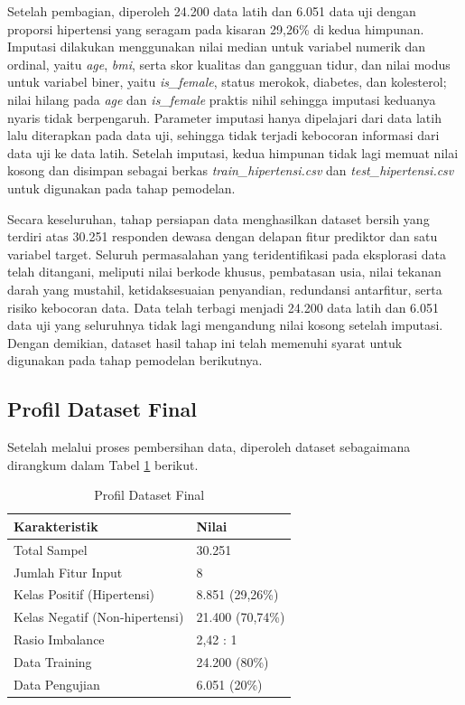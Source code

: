 Setelah pembagian, diperoleh 24.200 data latih dan 6.051 data uji dengan proporsi hipertensi yang seragam pada kisaran 29,26\% di kedua himpunan. Imputasi dilakukan menggunakan nilai median untuk variabel numerik dan ordinal, yaitu \textit{age}, \textit{bmi}, serta skor kualitas dan gangguan tidur, dan nilai modus untuk variabel biner, yaitu \textit{is\_female}, status merokok, diabetes, dan kolesterol; nilai hilang pada \textit{age} dan \textit{is\_female} praktis nihil sehingga imputasi keduanya nyaris tidak berpengaruh. Parameter imputasi hanya dipelajari dari data latih lalu diterapkan pada data uji, sehingga tidak terjadi kebocoran informasi dari data uji ke data latih. Setelah imputasi, kedua himpunan tidak lagi memuat nilai kosong dan disimpan sebagai berkas \textit{train\_hipertensi.csv} dan \textit{test\_hipertensi.csv} untuk digunakan pada tahap pemodelan.

Secara keseluruhan, tahap persiapan data menghasilkan dataset bersih yang terdiri atas 30.251 responden dewasa dengan delapan fitur prediktor dan satu variabel target. Seluruh permasalahan yang teridentifikasi pada eksplorasi data telah ditangani, meliputi nilai berkode khusus, pembatasan usia, nilai tekanan darah yang mustahil, ketidaksesuaian penyandian, redundansi antarfitur, serta risiko kebocoran data. Data telah terbagi menjadi 24.200 data latih dan 6.051 data uji yang seluruhnya tidak lagi mengandung nilai kosong setelah imputasi. Dengan demikian, dataset hasil tahap ini telah memenuhi syarat untuk digunakan pada tahap pemodelan berikutnya.









\subsection{Profil Dataset Final}
Setelah melalui proses pembersihan data, diperoleh dataset sebagaimana dirangkum dalam Tabel \ref{tab:profil-dataset-final} berikut.

\begin{table}[H]
    \centering
    \caption{Profil Dataset Final}
    \label{tab:profil-dataset-final}
    \begin{tabular}{|p{5.5cm}|p{5.5cm}|}
        \hline
        \textbf{Karakteristik} & \textbf{Nilai} \\
        \hline
        Total Sampel & 30.251 \\
        \hline
        Jumlah Fitur Input & 8 \\
        \hline
        Kelas Positif (Hipertensi) & 8.851 (29,26\%) \\
        \hline
        Kelas Negatif (Non-hipertensi) & 21.400 (70,74\%) \\
        \hline
        Rasio Imbalance & 2,42 : 1 \\
        \hline
        Data Training & 24.200 (80\%) \\
        \hline
        Data Pengujian & 6.051 (20\%) \\
        \hline
    \end{tabular}
\end{table}

